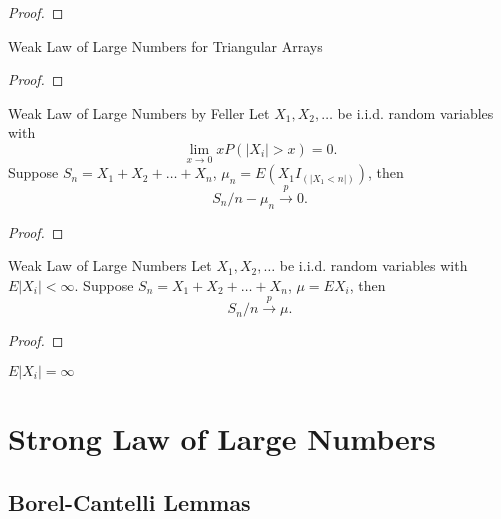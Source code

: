 \begin{proof}
    
\end{proof}

\begin{theorem}{Weak Law of Large Numbers for Triangular Arrays}{}
    
\end{theorem}

\begin{proof}
    
\end{proof}

\begin{theorem}{Weak Law of Large Numbers by Feller}{}
    Let $X_1,X_2,\ldots$ be i.i.d. random variables with
    \begin{equation}
        \lim_{x\rightarrow 0}xP(|X_i|>x)=0.
    \end{equation}
    Suppose $S_n=X_1+X_2+\ldots+X_n$, $\mu_n=E\left(X_1I_{(|X_1<n|)}\right)$, then
    \begin{equation}
        S_n/n-\mu_n\stackrel{p}{\rightarrow}0.
    \end{equation}
\end{theorem}

\begin{proof}
    
\end{proof}

\begin{theorem}{Weak Law of Large Numbers}{}
    Let $X_1,X_2,\ldots$ be i.i.d. random variables with $E|X_i|<\infty$. Suppose $S_n=X_1+X_2+\ldots+X_n$, $\mu=EX_i$, then
    \begin{equation}
        S_n/n\stackrel{p}{\rightarrow}\mu.
    \end{equation}
\end{theorem}

\begin{proof}
    
\end{proof}

\begin{note}
    $E|X_i|=\infty$
\end{note}

\section{Strong Law of Large Numbers}

\subsection{Borel-Cantelli Lemmas}

